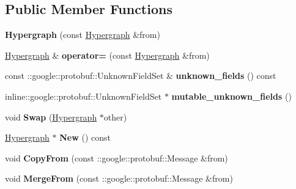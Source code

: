 \subsection*{Public Member Functions}
\begin{DoxyCompactItemize}
\item 
\hypertarget{classHypergraph_aa5b69fea3073cbbc6230c403aba60a13}{
{\bfseries Hypergraph} (const \hyperlink{classHypergraph}{Hypergraph} \&from)}
\label{classHypergraph_aa5b69fea3073cbbc6230c403aba60a13}

\item 
\hypertarget{classHypergraph_a6fa4366f554df3ffd7aa3694a3612006}{
\hyperlink{classHypergraph}{Hypergraph} \& {\bfseries operator=} (const \hyperlink{classHypergraph}{Hypergraph} \&from)}
\label{classHypergraph_a6fa4366f554df3ffd7aa3694a3612006}

\item 
\hypertarget{classHypergraph_a20ec2be2fda0e1db366f26c95817cd89}{
const ::google::protobuf::UnknownFieldSet \& {\bfseries unknown\_\-fields} () const }
\label{classHypergraph_a20ec2be2fda0e1db366f26c95817cd89}

\item 
\hypertarget{classHypergraph_a423987a46404cd3221a5c4035050b4b8}{
inline::google::protobuf::UnknownFieldSet $\ast$ {\bfseries mutable\_\-unknown\_\-fields} ()}
\label{classHypergraph_a423987a46404cd3221a5c4035050b4b8}

\item 
\hypertarget{classHypergraph_ac4a85460aabebe97e0411a30d80f720d}{
void {\bfseries Swap} (\hyperlink{classHypergraph}{Hypergraph} $\ast$other)}
\label{classHypergraph_ac4a85460aabebe97e0411a30d80f720d}

\item 
\hypertarget{classHypergraph_a9b21d571070e88fe8ed3f6751e495b04}{
\hyperlink{classHypergraph}{Hypergraph} $\ast$ {\bfseries New} () const }
\label{classHypergraph_a9b21d571070e88fe8ed3f6751e495b04}

\item 
\hypertarget{classHypergraph_a344289a1a02daaa7e9bb2284507bc25b}{
void {\bfseries CopyFrom} (const ::google::protobuf::Message \&from)}
\label{classHypergraph_a344289a1a02daaa7e9bb2284507bc25b}

\item 
\hypertarget{classHypergraph_a4aafea60a0bf75fe2c2f66172101110b}{
void {\bfseries MergeFrom} (const ::google::protobuf::Message \&from)}
\label{classHypergraph_a4aafea60a0bf75fe2c2f66172101110b}


\end{DoxyCompactItemize}
